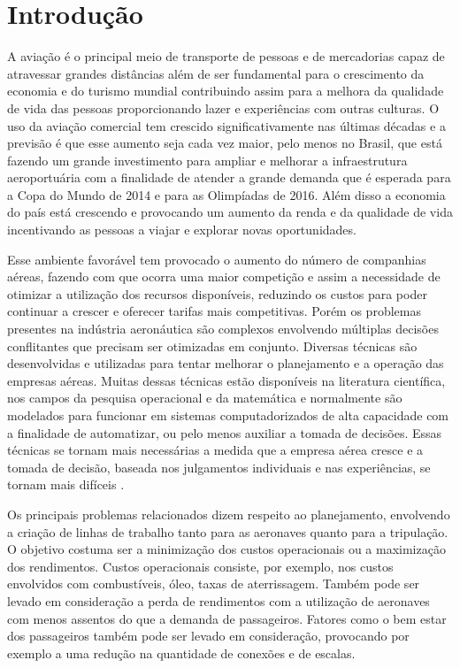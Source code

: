 \chapter{Introdução}
  
 A aviação é o principal meio de transporte de pessoas e de mercadorias capaz
 de atravessar grandes distâncias além de ser fundamental para o crescimento
 da economia e do turismo mundial contribuindo assim para a melhora da
 qualidade de vida das pessoas proporcionando lazer e experiências com outras
 culturas. O uso da aviação comercial tem crescido significativamente nas
 últimas décadas e a previsão é que esse aumento seja cada vez maior, pelo
 menos no Brasil, que está fazendo um grande investimento para ampliar e
 melhorar a infraestrutura aeroportuária com a finalidade de atender a grande
 demanda que é esperada para a Copa do Mundo de 2014 e para as Olimpíadas de
 2016. Além disso a economia do país está crescendo e provocando um aumento da
 renda e da qualidade de vida incentivando as pessoas a viajar e explorar novas
 oportunidades.

  	
Esse ambiente favorável tem provocado o aumento do número de companhias
aéreas, fazendo com que ocorra uma maior competição e assim a necessidade de
otimizar a utilização dos recursos disponíveis, reduzindo os custos para
poder continuar a crescer e oferecer tarifas mais competitivas. Porém os
problemas presentes na indústria aeronáutica são complexos envolvendo
múltiplas decisões conflitantes que precisam ser otimizadas em conjunto.
Diversas técnicas são desenvolvidas e utilizadas para tentar melhorar o
planejamento e a operação das empresas aéreas. Muitas dessas técnicas estão
disponíveis na literatura científica, nos campos da pesquisa operacional e da
matemática e normalmente são modelados para funcionar em sistemas
computadorizados de alta capacidade com a finalidade de automatizar, ou pelo
menos auxiliar a tomada de decisões. Essas técnicas se tornam mais
necessárias a medida que a empresa aérea cresce e a tomada de decisão,
baseada nos julgamentos individuais e nas experiências, se tornam mais
difíceis \cite{ahmed2009}.
  	
  	
Os principais problemas relacionados dizem respeito ao planejamento, envolvendo
a criação de linhas de trabalho tanto para as aeronaves quanto para a
tripulação. O objetivo costuma ser a minimização dos custos operacionais ou a
maximização dos rendimentos. Custos operacionais consiste, por exemplo, nos
custos envolvidos com combustíveis, óleo, taxas de aterrissagem. Também pode
ser levado em consideração a perda de rendimentos com a utilização de aeronaves
com menos assentos do que a demanda de passageiros. Fatores como o bem
estar dos passageiros também pode ser levado em consideração, provocando por
exemplo a uma redução na quantidade de conexões e de escalas.
	
